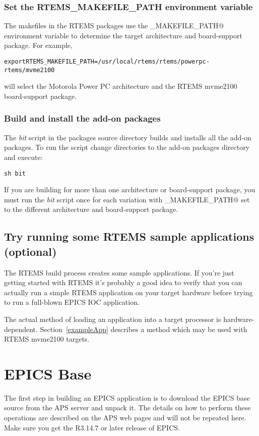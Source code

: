 \documentclass{report}
\begin{document}
\subsection{Set the RTEMS\_MAKEFILE\_PATH environment variable}
The makefiles in the RTEMS packages use the \verb@RTEMS_MAKEFILE_PATH@ environment variable to determine the
target architecture and board-support package.  For example,
\begin{alltt}
export RTEMS_MAKEFILE_PATH=/usr/local/rtems/rtems\rtemsToolVersion/powerpc-rtems\rtemsToolVersion/mvme2100
\end{alltt}
will select the Motorola Power PC architecture and the RTEMS mvme2100 board-support package.

\subsection{Build and install the add-on packages}
The {\it bit} script in the packages source directory builds and installs all the add-on packages.  To run
the script change directories to the add-on packages directory and execute:
\begin{verbatim}
sh bit
\end{verbatim}

If you are building for more than one architecture or board-support package, you must run the {\it bit} script once
for each variation with \verb@RTEMS_MAKEFILE_PATH@ set to the different architecture and board-support package.

\section{Try running some RTEMS sample applications (optional)}
The RTEMS build process creates some sample applications.  If you're just getting started with RTEMS it's probably
a good idea to verify that you can actually run a simple RTEMS application on your target hardware before trying to
run a full-blown EPICS IOC application.

The actual method of loading an application into a target processor is
hardware-dependent.  Section~\ref{exampleApp} describes a method which
may be used with RTEMS mvme2100 targets.

\chapter{EPICS Base}
The first step in building an EPICS application is to download the EPICS
base source from the APS server and unpack it.   The details on how
to perform these operations are described on the APS web pages and will
not be repeated here.  Make sure you get the R3.14.7 or later release of EPICS.
\end{document}
